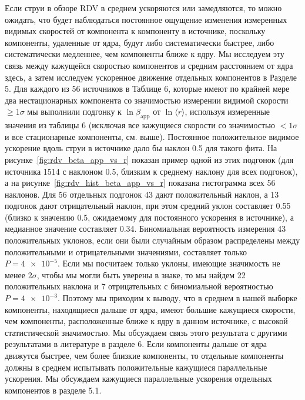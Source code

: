 Если струи в обзоре RDV в среднем ускоряются или замедляются, то можно ожидать, что будет
наблюдаться постоянное ощущение изменения измеренных видимых скоростей от компонента к компоненту в
источнике, поскольку компоненты, удаленные от ядра, будут либо систематически быстрее, либо
систематически медленнее, чем компоненты ближе к ядру. Мы исследуем эту связь между кажущейся
скоростью компонентов и средним расстоянием от ядра здесь, а затем исследуем ускоренное движение
отдельных компонентов в Разделе 5. Для каждого из 56 источников в Таблице 6, которые имеют по
крайней мере два нестационарных компонента со значимостью измерении видимой скорости
$\geqslant1\sigma$ мы выполнили подгонку к $\ln \beta_\text{app}$ от $\ln \langle r \rangle$,
используя измеренные значения из таблицы 6 (исключая все кажущиеся скорости со значимостью
$<1\sigma$ и все стационарные компоненты, см. выше). Постоянное положительное видимое ускорение
вдоль струи в источнике дало бы наклон 0.5 для такого фита. На рисунке~\ref{fig:rdv_beta_app_vs_r}
показан пример одной из этих подгонок (для источника 1514 с наклоном 0.5, близким к
среднему наклону для всех подгонок), а на рисунке~\ref{fig:rdv_hist_beta_app_vs_r} показана
гистограмма всех 56 наклонов. Для 56 отдельных подгонок 43 дают положительный наклон, а 13 подгонок
дают отрицательный наклон, при этом средний уклон составляет 0.55 (близко к значению 0.5, ожидаемому
для постоянного ускорения в источнике), а медианное значение составляет 0.34. Биномиальная
вероятность измерения 43 положительных уклонов, если они были случайным образом распределены между
положительными и отрицательными значениями, составляет только $P = \num{4e-5}$. Если мы посчитаем
только уклоны, имеющие значимость не менее $2\sigma$, чтобы мы могли быть уверены в знаке, то мы
найдем 22 положительных наклона и 7 отрицательных с биномиальной вероятностью $P = \num{4e-3}$.
Поэтому мы приходим к выводу, что в среднем в нашей выборке компоненты, находящиеся дальше от ядра,
имеют большие кажущиеся скорости, чем компоненты, расположенные ближе к ядру в данном источнике, с
высокой статистической значимостью. Мы обсуждаем связь этого результата с другими результатами в
литературе в разделе 6. Если компоненты дальше от ядра движутся быстрее, чем более близкие
компоненты, то отдельные компоненты должны в среднем испытывать положительные кажущиеся параллельные
ускорения. Мы обсуждаем кажущиеся параллельные ускорения отдельных компонентов в разделе 5.1.

